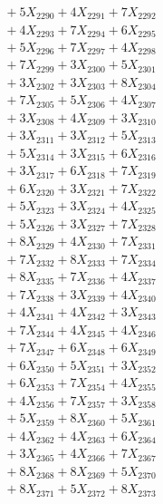 \documentclass[a4paper,10pt]{article}
\begin{document}
{\begin{align}
&\;  + 5 X_{2290} + 4 X_{2291} + 7 X_{2292} \\[0.3ex]
&\;  + 4 X_{2293} + 7 X_{2294} + 6 X_{2295} \\[0.3ex]
&\;  + 5 X_{2296} + 7 X_{2297} + 4 X_{2298} \\[0.3ex]
&\;  + 7 X_{2299} + 3 X_{2300} + 5 X_{2301} \\[0.3ex]
&\;  + 3 X_{2302} + 3 X_{2303} + 8 X_{2304} \\[0.3ex]
&\;  + 7 X_{2305} + 5 X_{2306} + 4 X_{2307} \\[0.3ex]
&\;  + 3 X_{2308} + 4 X_{2309} + 3 X_{2310} \\[0.3ex]
&\;  + 3 X_{2311} + 3 X_{2312} + 5 X_{2313} \\[0.3ex]
&\;  + 5 X_{2314} + 3 X_{2315} + 6 X_{2316} \\[0.3ex]
&\;  + 3 X_{2317} + 6 X_{2318} + 7 X_{2319} \\[0.5ex]\allowbreak
&\;  + 6 X_{2320} + 3 X_{2321} + 7 X_{2322} \\[0.3ex]
&\;  + 5 X_{2323} + 3 X_{2324} + 4 X_{2325} \\[0.3ex]
&\;  + 5 X_{2326} + 3 X_{2327} + 7 X_{2328} \\[0.3ex]
&\;  + 8 X_{2329} + 4 X_{2330} + 7 X_{2331} \\[0.3ex]
&\;  + 7 X_{2332} + 8 X_{2333} + 7 X_{2334} \\[0.3ex]
&\;  + 8 X_{2335} + 7 X_{2336} + 4 X_{2337} \\[0.3ex]
&\;  + 7 X_{2338} + 3 X_{2339} + 4 X_{2340} \\[0.3ex]
&\;  + 4 X_{2341} + 4 X_{2342} + 3 X_{2343} \\[0.3ex]
&\;  + 7 X_{2344} + 4 X_{2345} + 4 X_{2346} \\[0.3ex]
&\;  + 7 X_{2347} + 6 X_{2348} + 6 X_{2349} \\[0.5ex]\allowbreak
&\;  + 6 X_{2350} + 5 X_{2351} + 3 X_{2352} \\[0.3ex]
&\;  + 6 X_{2353} + 7 X_{2354} + 4 X_{2355} \\[0.3ex]
&\;  + 4 X_{2356} + 7 X_{2357} + 3 X_{2358} \\[0.3ex]
&\;  + 5 X_{2359} + 8 X_{2360} + 5 X_{2361} \\[0.3ex]
&\;  + 4 X_{2362} + 4 X_{2363} + 6 X_{2364} \\[0.3ex]
&\;  + 3 X_{2365} + 4 X_{2366} + 7 X_{2367} \\[0.3ex]
&\;  + 8 X_{2368} + 8 X_{2369} + 5 X_{2370} \\[0.3ex]
&\;  + 8 X_{2371} + 5 X_{2372} + 8 X_{2373} \\[0.3ex]

\end{align}}
\end{document}
